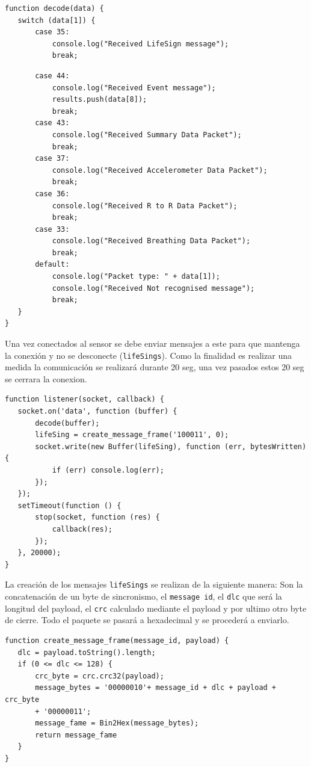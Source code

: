 \begin{verbatim}
function decode(data) {
   switch (data[1]) {
       case 35:
           console.log("Received LifeSign message");
           break;
           \end{verbatim}
           \begin{verbatim}
       case 44:
           console.log("Received Event message");
           results.push(data[8]);
           break;
       case 43:
           console.log("Received Summary Data Packet");
           break;
       case 37:
           console.log("Received Accelerometer Data Packet");
           break;
       case 36:
           console.log("Received R to R Data Packet");
           break;
       case 33:
           console.log("Received Breathing Data Packet");
           break;
       default:
           console.log("Packet type: " + data[1]);
           console.log("Received Not recognised message");
           break;
   }
}
\end{verbatim}

Una vez conectados al sensor se debe enviar mensajes a este para que mantenga la conexión y no se desconecte (\texttt{lifeSings}). Como la finalidad es realizar una medida la comunicación se realizará durante 20 seg, una vez pasados estos 20 seg se cerrara la conexion. 

\begin{verbatim}
function listener(socket, callback) {
   socket.on('data', function (buffer) {
       decode(buffer);
       lifeSing = create_message_frame('100011', 0);
       socket.write(new Buffer(lifeSing), function (err, bytesWritten) {
           if (err) console.log(err);
       });
   });
   setTimeout(function () {
       stop(socket, function (res) {
           callback(res);
       });
   }, 20000);
}
\end{verbatim}

La creación de los mensajes \texttt{lifeSings} se realizan de la siguiente manera: Son la concatenación de un byte de sincronismo, el \texttt{message id}, el \texttt{dlc} que será la longitud del payload, el \texttt{crc} calculado mediante el payload y por ultimo otro byte de cierre. Todo el paquete se pasará a hexadecimal y se procederá a enviarlo.
 \pagebreak
\begin{verbatim}
function create_message_frame(message_id, payload) {
   dlc = payload.toString().length;
   if (0 <= dlc <= 128) {
       crc_byte = crc.crc32(payload);
       message_bytes = '00000010'+ message_id + dlc + payload + crc_byte 
       + '00000011';
       message_fame = Bin2Hex(message_bytes);
       return message_fame
   }
}
\end{verbatim}

